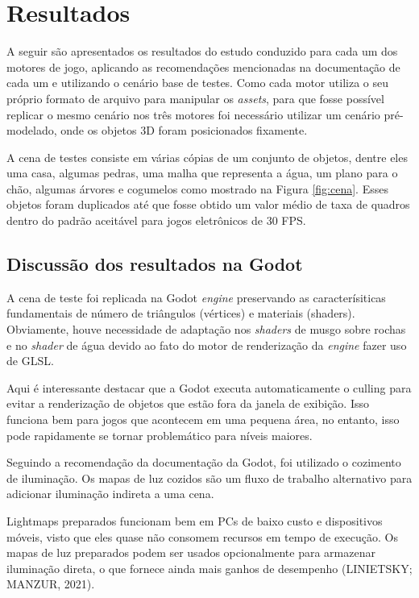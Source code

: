 \chapter{Resultados}
\label{chap:resultados}

A seguir são apresentados os resultados do estudo conduzido para cada um dos motores de jogo, aplicando as recomendações mencionadas na documentação de cada um e utilizando o cenário base de testes. Como cada motor utiliza o seu próprio formato de arquivo para manipular os \textit{assets}, para que fosse possível replicar o mesmo cenário nos três motores foi necessário utilizar um cenário pré-modelado, onde os objetos 3D foram posicionados fixamente.

A cena de testes consiste em várias cópias de um conjunto de objetos, dentre eles uma casa, algumas pedras, uma malha que representa a água, um plano para o chão, algumas árvores e cogumelos como mostrado na Figura \ref{fig:cena}. Esses objetos foram duplicados até que fosse obtido um valor médio de taxa de quadros dentro do padrão aceitável para jogos eletrônicos de 30 FPS.



\section{Discussão dos resultados na Godot}
\label{sec:resultado-godot}

A cena de teste foi replicada na Godot \textit{engine} preservando as caracterísiticas fundamentais de número de triângulos (vértices) e materiais (shaders). Obviamente, houve necessidade de adaptação nos \textit{shaders} de musgo sobre rochas e no \textit{shader} de água devido ao fato do motor de renderização da \textit{engine} fazer uso de GLSL.

Aqui é interessante destacar que a Godot executa automaticamente o culling para evitar a renderização de objetos que estão fora da janela de exibição. Isso funciona bem para jogos que acontecem em uma pequena área, no entanto, isso pode rapidamente se tornar problemático para níveis maiores.

Seguindo a recomendação da documentação da Godot, foi utilizado o cozimento de iluminação. Os mapas de luz cozidos são um fluxo de trabalho alternativo para adicionar iluminação indireta a uma cena. 

Lightmaps preparados funcionam bem em PCs de baixo custo e dispositivos móveis, visto que eles quase não consomem recursos em tempo de execução. Os mapas de luz preparados podem ser usados opcionalmente para armazenar iluminação direta, o que fornece ainda mais ganhos de desempenho (LINIETSKY; MANZUR, 2021)\nocite{manzur2021}.

